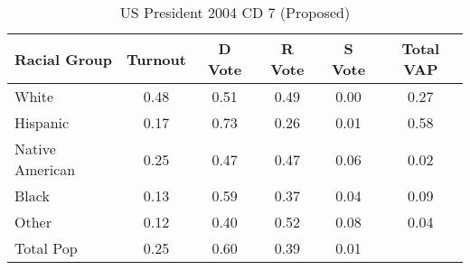 \begin{table}[htb]
\begin{center}
\caption{US President 2004 CD 7 (Proposed)}
\label{pres04_vap_cd_7}
\begin{tabular}{lccccc}
  \hline
Racial Group & Turnout & D Vote & R Vote & S Vote & Total VAP \\ 
  \hline
White & 0.48 & 0.51 & 0.49 & 0.00 & 0.27 \\ 
  Hispanic & 0.17 & 0.73 & 0.26 & 0.01 & 0.58 \\ 
  Native American & 0.25 & 0.47 & 0.47 & 0.06 & 0.02 \\ 
  Black & 0.13 & 0.59 & 0.37 & 0.04 & 0.09 \\ 
  Other & 0.12 & 0.40 & 0.52 & 0.08 & 0.04 \\ 
  Total Pop & 0.25 & 0.60 & 0.39 & 0.01 &  \\ 
   \hline
\end{tabular}
\end{center}
\end{table}
